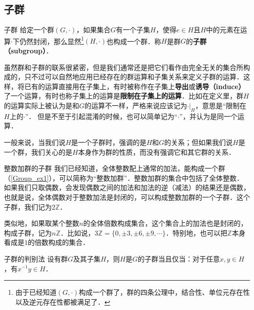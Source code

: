 

\subsection{子群}

\begin{definition}{子群}
给定一个群$(G, \cdot)$，如果集合$G$有一个子集$H$，使得$e\in H$且$H$中的元素在运算$\cdot$下仍然封闭，那么显然\footnote{由于已经知道$(G,\cdot)$构成一个群了，群的四条公理中，结合性、单位元存在性以及逆元存在性都被满足了．}$(H,\cdot)$也构成一个群．称$H$是群$G$的\textbf{子群（subgroup）}．
\end{definition}

虽然群和子群的联系很紧密，但是我们通常还是把它们看作由完全无关的集合所构成的，只不过可以自然地应用已经存在的群运算和子集关系来定义子群的运算．这样，将已有的运算直接用在子集上，有时被称作在子集上\textbf{导出}或\textbf{诱导（induce）}了一个运算，有时也称子集上的运算是\textbf{限制在子集上的运算}．比如在定义里，群$H$的运算实际上被认为是和$G$的运算不一样，严格来说应该记为$\cdot|_H$，意思是“限制在$H$上的$\cdot$”． 但是不至于引起混淆的时候，也可以简单记为“$\cdot$”，并认为是同一个运算．

一般来说，当我们说$H$是一个子群时，强调的是$H$和$G$的关系；但如果我们说$H$是一个群，我们关心的是$H$本身作为群的性质，而没有强调它和其它群的关系．

\begin{example}{整数加群的子群}\label{Group1_ex1}
我们已经知道，全体整数配上通常的加法，能构成一个群（\autoref{Group_ex1}），可以简称为“整数加群”．整数加群的集合中包括了全体整数．如果我们只取偶数，会发现偶数之间的加法和加法的逆（减法）的结果还是偶数，也就是说，全体偶数对于整数加法是封闭的，可以构成整数加群的一个子群．这个子群，我们记为$2\mathbb{Z}$．

类似地，如果取某个整数$n$的全体倍数构成集合，这个集合上的加法也是封闭的，构成子群，记为$n\mathbb{Z}$．比如说，$3\mathbb{Z}=\{0, \pm3, \pm6, \pm9, \cdots\}$．特别地，也可以把$\mathbb{Z}$本身看成是$1$的倍数构成的集合．
\end{example}

\begin{theorem}{子群的判别法}\label{Group1_the3}
设有群$G$及其子集$H$，则$H$是$G$的子群当且仅当：对于任意$x, y\in H$，有$x^{-1}y\in H$．
\end{theorem}

